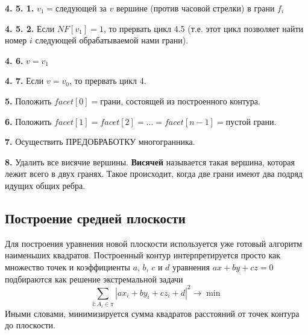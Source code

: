 \documentclass[a4paper,12pt, titlepage]{article}
\begin{document}
\begin{flushleft}
 \textbf{4. 5. 1.} $v_{1} = $следующей за $v$ вершине (против часовой стрелки) в грани $f_{i}$
\end{flushleft} 
\begin{flushleft}
 \textbf{4. 5. 2.} Если $NF[v_{1}] = 1$, то прервать цикл 4.5 (т.е. этот цикл позволяет найти номер $i$ следующей
обрабатываемой нами грани).
\end{flushleft} 
\begin{flushleft}
 \textbf{4. 6.} $v = v_{1}$	
\end{flushleft} 
\begin{flushleft}
 \textbf{4. 7.} Если $v = v_{0}$, то прервать цикл 4.
\end{flushleft} 
\begin{flushleft}
 \textbf{5.} Положить $facet[0] = $грани, состоящей из построенного контура.
\end{flushleft} 
\begin{flushleft}
 \textbf{6.} Положить $facet[1] = facet[2] = \ldots = facet[n - 1] = $пустой грани.
\end{flushleft} 
\begin{flushleft}
 \textbf{7.} Осуществить ПРЕДОБРАБОТКУ многогранника.
\end{flushleft} 
\begin{flushleft}
 \textbf{8.} Удалить все висячие вершины. \textbf{Висячей} называется такая вершина, которая лежит всего в 
двух гранях. Такое происходит, когда две грани имеют два подряд идущих общих ребра.
\end{flushleft} 

\subsection{Построение средней плоскости}
\begin{flushleft}
  Для построения уравнения новой плоскости используется уже готовый алгоритм наименьших квадратов. Построенный
контур интерпретируется просто как множество точек и коэффициенты $a$, $b$, $c$ и $d$ уравнения 
$a x + b y + c z = 0$ подбираются как решение экстремальной задачи
$$
  \sum\limits_{i: A_{i} \in \pi}
	|a x_{i} + b y_{i} + c z_{i} + d |^{2} \to \min
$$
Иными словами, минимизируется сумма квадратов расстояний от точек контура до плоскости.
\end{flushleft} 
\end{document}
